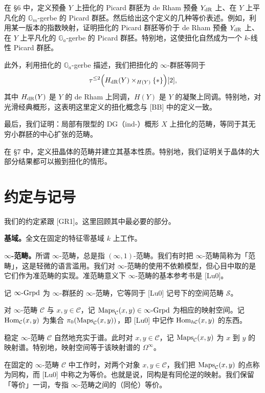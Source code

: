 在 §6 中，定义预叠 $Y$ 上扭化的 Picard 群胚为 de Rham 预叠 $Y_{\mathrm{dR}}$ 上、在 $Y$ 上平凡化的 $\mathbb{G}_m$-gerbe 的 Picard 群胚。然后给出这个定义的几种等价表述。例如，利用某一版本的指数映射，证明扭化的 Picard 群胚等价于 de Rham 预叠 $Y_{\mathrm{dR}}$ 上、在 $Y$ 上平凡化的 $\mathbb{G}_a$-gerbe 的 Picard 群胚。特别地，这使扭化自然成为一个 $k$-线性 Picard 群胚。

此外，利用扭化的 $\mathbb{G}_a$-gerbe 描述，我们把扭化的 $\infty$-群胚等同于
\[
\tau^{\le 2}\Big(H_{\mathrm{dR}}(Y)\times_{H(Y)}\{*\}\Big)[2],
\]
其中 $H_{\mathrm{dR}}(Y)$ 是 $Y$ 的 de Rham 上同调，$H(Y)$ 是 $Y$ 的凝聚上同调。特别地，对光滑经典概形，这表明这里定义的扭化概念与 [BB] 中的定义一致。

最后，我们证明：局部有限型的 DG（ind-）概形 $X$ 上扭化的范畴，等同于其无穷小群胚的中心扩张的范畴。

在 §7 中，定义扭晶体的范畴并建立其基本性质。特别地，我们证明关于晶体的大部分结果都可以搬到扭化的情形。

\section{约定与记号}

我们的约定紧跟 [GR1]。这里回顾其中最必要的部分。

\textbf{基域。}全文在固定的特征零基域 $k$ 上工作。

\textbf{$\infty$-范畴。}所谓 $\infty$-范畴，总是指 $(\infty,1)$-范畴。我们有时把 $\infty$-范畴简称为「范畴」，这是轻微的语言滥用。我们对 $\infty$-范畴的使用不依赖模型，但心目中取的是它们作为准范畴的实现。准范畴意义下 $\infty$-范畴的基本参考书是 [Lu0]。

记 $\infty\text{-}\mathrm{Grpd}$ 为 $\infty$-群胚的 $\infty$-范畴，它等同于 [Lu0] 记号下的空间范畴 $\mathcal{S}$。

对 $\infty$-范畴 $\mathcal{C}$ 与 $x,y\in\mathcal{C}$，记 $\mathrm{Maps}_{\mathcal{C}}(x,y)\in\infty\text{-}\mathrm{Grpd}$ 为相应的映射空间。记 $\mathrm{Hom}_{\mathcal{C}}(x,y)$ 为集合 $\pi_0(\mathrm{Maps}_{\mathcal{C}}(x,y))$，即 [Lu0] 中记作 $\mathrm{Hom}_{h\mathcal{C}}(x,y)$ 的东西。

稳定 $\infty$-范畴 $\mathcal{C}$ 自然地充实于谱。此时对 $x,y\in\mathcal{C}$，记 $\mathrm{Maps}_{\mathcal{C}}(x,y)$ 为 $x$ 到 $y$ 的映射谱。特别地，映射空间等于该映射谱的 $\Omega^\infty$。

在固定的 $\infty$-范畴 $\mathcal{C}$ 中工作时，对两个对象 $x,y\in\mathcal{C}$，我们把 $\mathrm{Maps}_{\mathcal{C}}(x,y)$ 的点称为同构，而 [Lu0] 中称之为等价。也就是说，同构是有同伦逆的映射。我们保留「等价」一词，专指 $\infty$-范畴之间的（同伦）等价。

